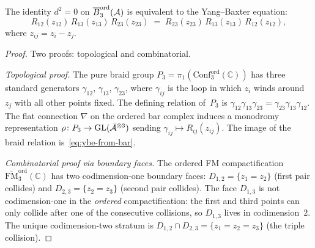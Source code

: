 \begin{proposition}[Yang--Baxter from $d^2=0$ on degree~$3$;
\ClaimStatusProvedHere]
\label{prop:ybe-from-d-squared}
The identity $d^2=0$ on
$\overline{B}^{\mathrm{ord}}_3(\mathcal{A})$ is equivalent to the
Yang--Baxter equation:
\begin{equation}\label{eq:ybe-from-bar}
R_{12}(z_{12})\,R_{13}(z_{13})\,R_{23}(z_{23})
\;=\;
R_{23}(z_{23})\,R_{13}(z_{13})\,R_{12}(z_{12}),
\end{equation}
where $z_{ij}=z_i-z_j$.
\end{proposition}

\begin{proof}
Two proofs: topological and combinatorial.

\emph{Topological proof.}
The pure braid group
$P_3=\pi_1(\mathrm{Conf}_3^{\mathrm{ord}}(\mathbb C))$
has three standard generators
$\gamma_{12}$, $\gamma_{13}$, $\gamma_{23}$, where
$\gamma_{ij}$ is the loop in which $z_i$ winds around $z_j$
with all other points fixed.
The defining relation of~$P_3$ is
$\gamma_{12}\gamma_{13}\gamma_{23}
=\gamma_{23}\gamma_{13}\gamma_{12}$.
The flat connection $\nabla$ on the ordered bar complex
induces a monodromy representation
$\rho\colon P_3\to\operatorname{GL}(\bar{\mathcal{A}}^{\otimes 3})$
sending $\gamma_{ij}\mapsto R_{ij}(z_{ij})$. The image
of the braid relation is~\eqref{eq:ybe-from-bar}.

\emph{Combinatorial proof via boundary faces.}
The ordered FM compactification
$\overline{\mathrm{FM}}_3^{\mathrm{ord}}(\mathbb C)$
has two codimension-one boundary faces:
$D_{1,2}=\{z_1=z_2\}$ (first pair collides) and
$D_{2,3}=\{z_2=z_3\}$ (second pair collides). The face
$D_{1,3}$ is not codimension-one in the \emph{ordered}
compactification: the first and third points can only
collide after one of the consecutive collisions, so
$D_{1,3}$ lives in codimension~$2$.
The unique codimension-two stratum is
$D_{1,2}\cap D_{2,3}=\{z_1=z_2=z_3\}$ (the triple collision).


\end{proof}
